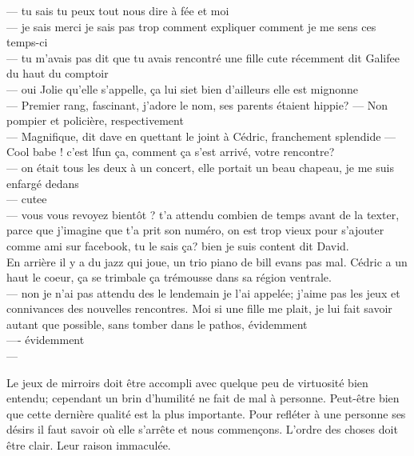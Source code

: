 \documentclass{article}
\begin{document}
--- tu sais tu peux tout nous dire à fée et moi \\
--- je sais merci je sais pas trop comment expliquer comment je me sens ces temps-ci\\
--- tu m'avais pas dit que tu avais rencontré une fille cute récemment dit Galifee du
haut du comptoir\\
--- oui Jolie qu'elle s'appelle, ça lui siet bien d'ailleurs elle est mignonne\\
--- Premier rang, fascinant, j'adore le nom, ses parents étaient hippie?
--- Non pompier et policière, respectivement\\
--- Magnifique, dit dave en quettant le joint à Cédric, franchement splendide
--- Cool babe ! c'est lfun ça, comment ça s'est arrivé, votre rencontre?\\
--- on était tous les deux à un concert, elle portait un beau chapeau, je me suis enfargé dedans\\
--- cutee\\
--- vous vous revoyez bientôt ? t'a attendu combien de temps avant de la texter,
parce que j'imagine que t'a prit son numéro, on est trop vieux pour s'ajouter comme ami
sur facebook, tu le sais ça? bien je suis content dit David.  \\

En arrière il y a du jazz qui joue, un trio piano de bill evans pas mal.
Cédric a un haut le coeur, ça se trimbale ça trémousse dans sa région ventrale.\\

--- non je n'ai pas attendu des le lendemain je l'ai appelée; j'aime pas les
jeux et connivances des nouvelles rencontres. Moi si une fille me plait, je lui
fait savoir autant que possible, sans tomber dans le pathos, évidemment\\
---- évidemment\\
---

Le jeux de mirroirs doit être accompli avec quelque peu de virtuosité bien
entendu; cependant un brin d'humilité ne fait de mal à personne. Peut-être
bien que cette dernière qualité est la plus importante. Pour refléter à une personne
ses désirs il faut savoir où elle s'arrête et nous commençons. L'ordre des choses
doit être clair. Leur raison immaculée.
\end{document}
